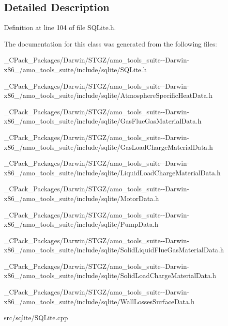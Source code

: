 \subsection{Detailed Description}


Definition at line 104 of file S\+Q\+Lite.\+h.



The documentation for this class was generated from the following files\+:\begin{DoxyCompactItemize}
\item 
\+\_\+\+C\+Pack\+\_\+\+Packages/\+Darwin/\+S\+T\+G\+Z/amo\+\_\+tools\+\_\+suite-\/-\/\+Darwin-\/x86\+\_/amo\+\_\+tools\+\_\+suite/include/sqlite/S\+Q\+Lite.\+h\item 
\+\_\+\+C\+Pack\+\_\+\+Packages/\+Darwin/\+S\+T\+G\+Z/amo\+\_\+tools\+\_\+suite-\/-\/\+Darwin-\/x86\+\_/amo\+\_\+tools\+\_\+suite/include/sqlite/Atmosphere\+Specific\+Heat\+Data.\+h\item 
\+\_\+\+C\+Pack\+\_\+\+Packages/\+Darwin/\+S\+T\+G\+Z/amo\+\_\+tools\+\_\+suite-\/-\/\+Darwin-\/x86\+\_/amo\+\_\+tools\+\_\+suite/include/sqlite/Gas\+Flue\+Gas\+Material\+Data.\+h\item 
\+\_\+\+C\+Pack\+\_\+\+Packages/\+Darwin/\+S\+T\+G\+Z/amo\+\_\+tools\+\_\+suite-\/-\/\+Darwin-\/x86\+\_/amo\+\_\+tools\+\_\+suite/include/sqlite/Gas\+Load\+Charge\+Material\+Data.\+h\item 
\+\_\+\+C\+Pack\+\_\+\+Packages/\+Darwin/\+S\+T\+G\+Z/amo\+\_\+tools\+\_\+suite-\/-\/\+Darwin-\/x86\+\_/amo\+\_\+tools\+\_\+suite/include/sqlite/Liquid\+Load\+Charge\+Material\+Data.\+h\item 
\+\_\+\+C\+Pack\+\_\+\+Packages/\+Darwin/\+S\+T\+G\+Z/amo\+\_\+tools\+\_\+suite-\/-\/\+Darwin-\/x86\+\_/amo\+\_\+tools\+\_\+suite/include/sqlite/Motor\+Data.\+h\item 
\+\_\+\+C\+Pack\+\_\+\+Packages/\+Darwin/\+S\+T\+G\+Z/amo\+\_\+tools\+\_\+suite-\/-\/\+Darwin-\/x86\+\_/amo\+\_\+tools\+\_\+suite/include/sqlite/Pump\+Data.\+h\item 
\+\_\+\+C\+Pack\+\_\+\+Packages/\+Darwin/\+S\+T\+G\+Z/amo\+\_\+tools\+\_\+suite-\/-\/\+Darwin-\/x86\+\_/amo\+\_\+tools\+\_\+suite/include/sqlite/Solid\+Liquid\+Flue\+Gas\+Material\+Data.\+h\item 
\+\_\+\+C\+Pack\+\_\+\+Packages/\+Darwin/\+S\+T\+G\+Z/amo\+\_\+tools\+\_\+suite-\/-\/\+Darwin-\/x86\+\_/amo\+\_\+tools\+\_\+suite/include/sqlite/Solid\+Load\+Charge\+Material\+Data.\+h\item 
\+\_\+\+C\+Pack\+\_\+\+Packages/\+Darwin/\+S\+T\+G\+Z/amo\+\_\+tools\+\_\+suite-\/-\/\+Darwin-\/x86\+\_/amo\+\_\+tools\+\_\+suite/include/sqlite/Wall\+Losses\+Surface\+Data.\+h\item 
src/sqlite/S\+Q\+Lite.\+cpp\end{DoxyCompactItemize}
